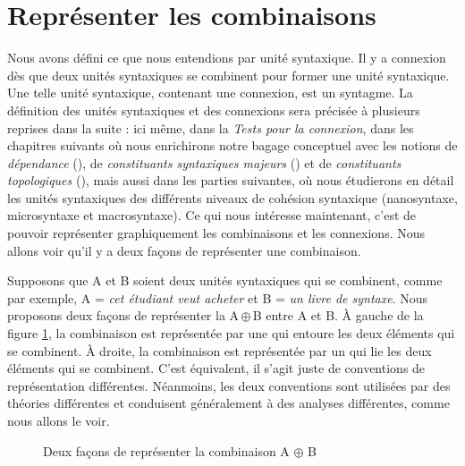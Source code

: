 \section{Représenter les combinaisons}\label{sec:3.2.12}
\begin{sloppypar}
Nous avons défini ce que nous entendions par unité syntaxique. Il y a connexion dès que deux unités syntaxiques se combinent pour former une unité syntaxique. Une telle unité syntaxique, contenant une connexion, est un syntagme. La définition des unités syntaxiques et des connexions sera précisée à plusieurs reprises dans la suite : ici même, dans la  \textit{Tests pour la connexion}, dans les chapitres suivants où nous enrichirons notre bagage conceptuel avec les notions de \textit{dépendance} (), de \textit{constituants syntaxiques majeurs} () et de \textit{constituants topologiques} (), mais aussi dans les parties suivantes, où nous étudierons en détail les unités syntaxiques des différents niveaux de cohésion syntaxique (nanosyntaxe, microsyntaxe et macrosyntaxe). Ce qui nous intéresse maintenant, c’est de pouvoir représenter graphiquement les combinaisons et les connexions. Nous allons voir qu’il y a deux façons de représenter une combinaison.
\end{sloppypar}

Supposons que A et B soient deux unités syntaxiques qui se combinent, comme par exemple, A = \textit{cet étudiant veut acheter} et B = \textit{un livre de syntaxe}. Nous proposons deux façons de représenter la  A\,${\oplus}$\,B entre A et B. À gauche de la figure \ref{fig:combiAB}, la combinaison est représentée par une  qui entoure les deux éléments qui se combinent. À droite, la combinaison est représentée par un  qui lie les deux éléments qui se combinent. C’est équivalent, il s’agit juste de conventions de représentation différentes. Néanmoins, les deux conventions sont utilisées par des théories différentes et conduisent généralement à des analyses différentes, comme nous allons le voir.

\begin{figure}
\caption{\label{fig:combiAB}Deux façons de représenter la combinaison A $\oplus$ B}
\end{figure}


